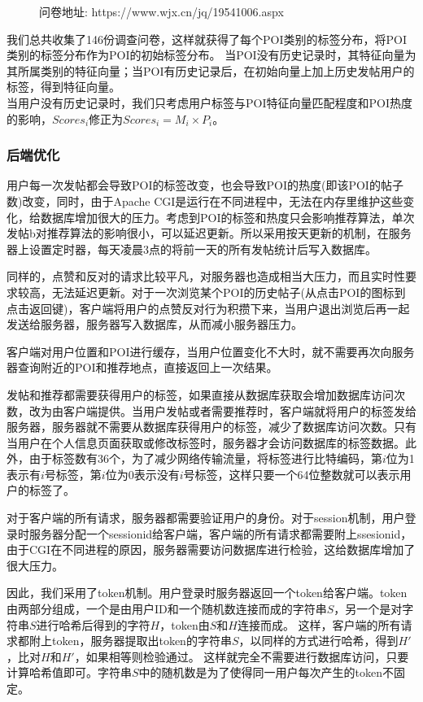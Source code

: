 \documentclass[UTF8]{article}
\begin{document}
\begin{figure}[H]
\begin{minipage}[t]{0.4\textwidth}
\end{minipage}
\caption{问卷地址: https://www.wjx.cn/jq/19541006.aspx}
\end{figure}
我们总共收集了146份调查问卷，这样就获得了每个POI类别的标签分布，将POI类别的标签分布作为POI的初始标签分布。
当POI没有历史记录时，其特征向量为其所属类别的特征向量；当POI有历史记录后，在初始向量上加上历史发帖用户的标签，得到特征向量。\\
当用户没有历史记录时，我们只考虑用户标签与POI特征向量匹配程度和POI热度的影响，$Scores_i$修正为$Scores_i=M_i \times P_i$。

\subsubsection{后端优化}
用户每一次发帖都会导致POI的标签改变，也会导致POI的热度(即该POI的帖子数)改变，同时，由于Apache CGI是运行在不同进程中，无法在内存里维护这些变化，给数据库增加很大的压力。考虑到POI的标签和热度只会影响推荐算法，单次发帖b对推荐算法的影响很小，可以延迟更新。所以采用按天更新的机制，在服务器上设置定时器，每天凌晨3点的将前一天的所有发帖统计后写入数据库。

同样的，点赞和反对的请求比较平凡，对服务器也造成相当大压力，而且实时性要求较高，无法延迟更新。对于一次浏览某个POI的历史帖子(从点击POI的图标到点击返回键)，客户端将用户的点赞反对行为积攒下来，当用户退出浏览后再一起发送给服务器，服务器写入数据库，从而减小服务器压力。

客户端对用户位置和POI进行缓存，当用户位置变化不大时，就不需要再次向服务器查询附近的POI和推荐地点，直接返回上一次结果。

发帖和推荐都需要获得用户的标签，如果直接从数据库获取会增加数据库访问次数，改为由客户端提供。当用户发帖或者需要推荐时，客户端就将用户的标签发给服务器，服务器就不需要从数据库获得用户的标签，减少了数据库访问次数。只有当用户在个人信息页面获取或修改标签时，服务器才会访问数据库的标签数据。此外，由于标签数有36个，为了减少网络传输流量，将标签进行比特编码，第$i$位为1表示有$i$号标签，第$i$位为0表示没有$i$号标签，这样只要一个64位整数就可以表示用户的标签了。

对于客户端的所有请求，服务器都需要验证用户的身份。对于session机制，用户登录时服务器分配一个sessionid给客户端，客户端的所有请求都需要附上ssesionid，由于CGI在不同进程的原因，服务器需要访问数据库进行检验，这给数据库增加了很大压力。

因此，我们采用了token机制。用户登录时服务器返回一个token给客户端。token由两部分组成，一个是由用户ID和一个随机数连接而成的字符串$S$，另一个是对字符串$S$进行哈希后得到的字符$H$，token由$S$和$H$连接而成。
这样，客户端的所有请求都附上token，服务器提取出token的字符串$S$，以同样的方式进行哈希，得到$H'$，比对$H$和$H'$，如果相等则检验通过。
这样就完全不需要进行数据库访问，只要计算哈希值即可。字符串$S$中的随机数是为了使得同一用户每次产生的token不固定。
\end{document}
